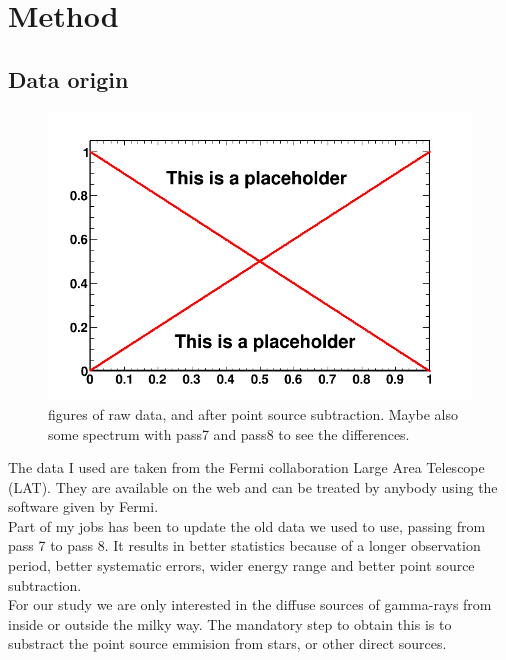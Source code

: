 \chapter{Method}
\label{ch:method}

\section{Data origin}

\begin{figure}
 \centering
 \includegraphics[width=.9\linewidth]{pic/dummy.png}
 \caption{figures of raw data, and after point source subtraction. Maybe also some spectrum with pass7 and pass8 to see the differences.}
 \label{fig:method_pass8}
\end{figure}

The data I used are taken from the Fermi collaboration Large Area Telescope (LAT). They are available on the web and can be treated by anybody using the software given by Fermi.\\

Part of my jobs has been to update the old data we used to use, passing from pass 7 to pass 8. It results in better statistics because of a longer observation period, better systematic errors, wider energy range and better point source subtraction.\\

For our study we are only interested in the diffuse sources of gamma-rays from inside or outside the milky way. The mandatory step to obtain this is to substract the point source emmision from stars, or other direct sources.\\

